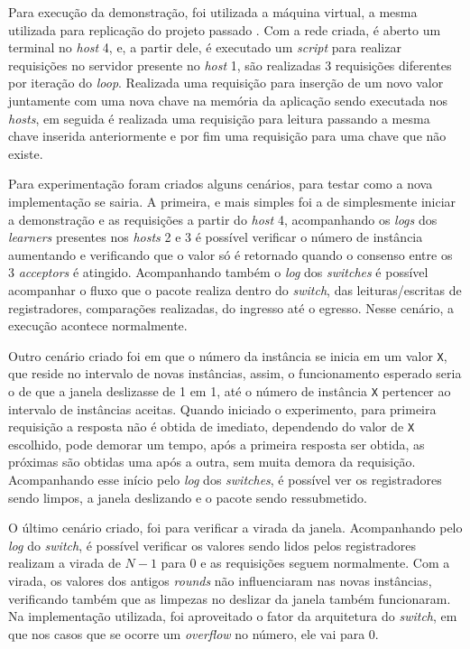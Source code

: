 \documentclass[
    12pt,
    openright, 
    oneside,
    a4paper,
    french,
    english,
    brazil
    ]{facom-ufu-abntex2}
\theoremstyle{definition}
\begin{document}
Para execução da demonstração, foi utilizada a máquina virtual, a mesma utilizada para replicação do projeto
passado \cite{dang2016paxos}. Com a rede criada, é aberto um terminal no \emph{host} 4, e, a partir dele,
é executado um \emph{script} para realizar requisições no servidor presente no \emph{host} 1, são realizadas
3 requisições diferentes por iteração do \emph{loop}. Realizada uma requisição para inserção de um novo valor juntamente
com uma nova chave na memória da aplicação sendo executada nos \emph{hosts}, em seguida é realizada uma requisição para 
leitura passando a mesma chave inserida anteriormente e por fim uma requisição para uma chave que não existe.

Para experimentação foram criados alguns cenários, para testar como a nova implementação se sairia. A primeira, e mais simples
foi a de simplesmente iniciar a demonstração e as requisições a partir do \emph{host} 4, acompanhando os \emph{logs} dos
\emph{learners} presentes nos \emph{hosts} 2 e 3 é possível verificar o número de instância aumentando e verificando que 
o valor só é retornado quando o consenso entre os 3 \emph{acceptors} é atingido. Acompanhando também o \emph{log} dos
\emph{switches} é possível acompanhar o fluxo que o pacote realiza dentro do \emph{switch}, das leituras/escritas de registradores,
comparações realizadas, do ingresso até o egresso. Nesse cenário, a execução acontece normalmente.

Outro cenário criado foi em que o número da instância se inicia em um valor \texttt{X}, que reside no intervalo de novas instâncias,
assim, o funcionamento esperado seria o de que a janela deslizasse de 1 em 1, até o número de instância \texttt{X} pertencer ao intervalo
de instâncias aceitas. Quando iniciado o experimento, para primeira requisição a resposta não é obtida de imediato, dependendo do valor de
\texttt{X} escolhido, pode demorar um tempo, após a primeira resposta ser obtida, as próximas são obtidas uma após a outra, sem muita 
demora da requisição. Acompanhando esse início pelo \emph{log} dos \emph{switches}, é possível ver os registradores sendo limpos,
a janela deslizando e o pacote sendo ressubmetido.

O último cenário criado, foi para verificar a virada da janela. Acompanhando pelo \emph{log} do \emph{switch}, é possível
verificar os valores sendo lidos pelos registradores realizam a virada de $N - 1$ para 0 e as requisições seguem normalmente.
Com a virada, os valores dos antigos \emph{rounds} não influenciaram nas novas instâncias, verificando também que as limpezas
no deslizar da janela também funcionaram. Na implementação utilizada, foi aproveitado o fator da arquitetura do \emph{switch},
em que nos casos que se ocorre um \emph{overflow} no número, ele vai para 0.
\end{document}
